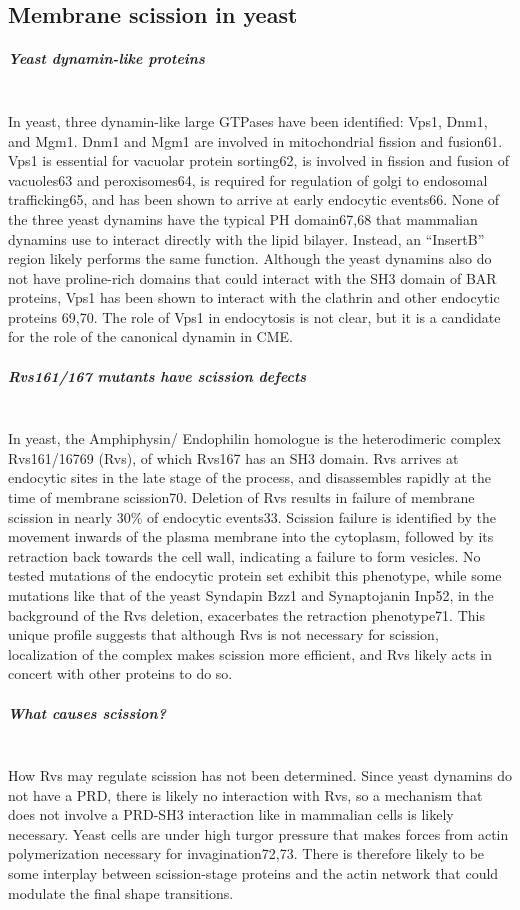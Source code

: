 	\subsection{Membrane scission in yeast} \label {yeast_scission}
		\subparagraph{Yeast dynamin-like proteins}
		\mbox{} \\
		In yeast, three dynamin-like large GTPases have been identified: Vps1, Dnm1, and Mgm1. Dnm1 and Mgm1 are involved in mitochondrial fission and fusion61. Vps1 is essential for vacuolar protein sorting62, is involved in fission and fusion of vacuoles63 and peroxisomes64, is required for regulation of golgi to endosomal trafficking65, and has been shown to arrive at early endocytic events66. None of the three yeast dynamins have the typical PH domain67,68 that mammalian dynamins use to interact directly with the lipid bilayer. Instead, an “InsertB” region likely performs the same function. Although the yeast dynamins also do not have proline-rich domains that could interact with the SH3 domain of BAR proteins, Vps1 has been shown to interact with the clathrin and other endocytic proteins 69,70. The role of Vps1 in endocytosis is not clear, but it is a candidate for the role of the canonical dynamin in CME.

		\subparagraph{Rvs161/167 mutants have scission defects}
		\mbox{} \\
		In yeast, the Amphiphysin/ Endophilin homologue is the heterodimeric complex Rvs161/16769 (Rvs), of which Rvs167 has an SH3 domain. Rvs arrives at endocytic sites in the late stage of the process, and disassembles rapidly at the time of membrane scission70. Deletion of Rvs results in failure of membrane scission in nearly 30\% of endocytic events33. Scission failure is identified by the movement inwards of the plasma membrane into the cytoplasm, followed by its retraction back towards the cell wall, indicating a failure to form vesicles. No tested mutations of the endocytic protein set exhibit this phenotype, while some mutations like that of the yeast Syndapin Bzz1 and Synaptojanin Inp52, in the background of the Rvs deletion, exacerbates the retraction phenotype71. This unique profile suggests that although Rvs is not necessary for scission, localization of the complex makes scission more efficient, and Rvs likely acts in concert with other proteins to do so. 

		\subparagraph{What causes scission?}
		\mbox{} \\
		How Rvs may regulate scission has not been determined. Since yeast dynamins do not have a PRD, there is likely no interaction with Rvs, so a mechanism that does not involve a PRD-SH3 interaction like in mammalian cells is likely necessary. Yeast cells are under high turgor pressure that makes forces from actin polymerization necessary for invagination72,73. There is therefore likely to be some interplay between scission-stage proteins and the actin network that could modulate the final shape transitions. 


